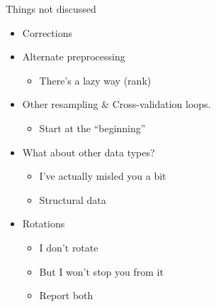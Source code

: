 \documentclass[
  ignorenonframetext,
]{beamer}
\providecommand{\tightlist}{%
  \setlength{\itemsep}{0pt}\setlength{\parskip}{0pt}}
\begin{document}
\begin{frame}{Things not discussed}
\protect\hypertarget{things-not-discussed}{}

\begin{itemize}[<+->]
\tightlist
\item
  Corrections
\item
  Alternate preprocessing

  \begin{itemize}[<+->]
  \tightlist
  \item
    There's a lazy way (rank)
  \end{itemize}
\item
  Other resampling \& Cross-validation loops.

  \begin{itemize}[<+->]
  \tightlist
  \item
    Start at the ``beginning''
  \end{itemize}
\item
  What about other data types?

  \begin{itemize}[<+->]
  \tightlist
  \item
    I've actually misled you a bit
  \item
    Structural data
  \end{itemize}
\item
  Rotations

  \begin{itemize}[<+->]
  \tightlist
  \item
    I don't rotate
  \item
    But I won't stop you from it
  \item
    Report both
  \end{itemize}
\end{itemize}

\end{frame}
\end{document}

